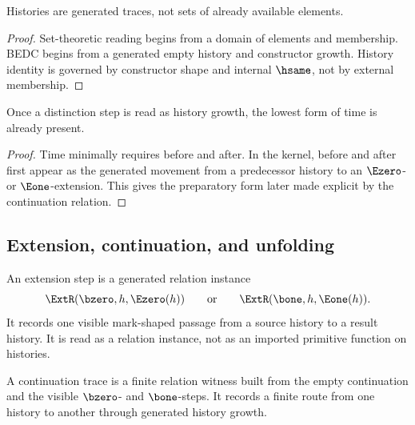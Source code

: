 \begin{corollary}
\label{cor:philosophy-histories-are-not-sets}
Histories are generated traces, not sets of already available elements.
\end{corollary}
\begin{proof}
Set-theoretic reading begins from a domain of elements and membership.
BEDC begins from a generated empty history and constructor growth.
History identity is governed by constructor shape and internal
\(\hsame\), not by external membership.
\end{proof}

\begin{corollary}
\label{cor:philosophy-lowest-form-time-history-growth}
Once a distinction step is read as history growth, the lowest form of
time is already present.
\end{corollary}
\begin{proof}
Time minimally requires before and after. In the kernel, before and
after first appear as the generated movement from a predecessor history
to an \(\Ezero\)- or \(\Eone\)-extension. This gives the preparatory
form later made explicit by the continuation relation.
\end{proof}

\subsection{Extension, continuation, and unfolding}
\label{subsec:extension-continuation-unfolding}

\begin{definition}
\label{def:philosophy-extension-step}
An extension step is a generated relation instance
$$
\ExtR(\bzero,h,\Ezero(h))
\qquad\text{or}\qquad
\ExtR(\bone,h,\Eone(h)).
$$
It records one visible mark-shaped passage from a source history to a
result history. It is read as a relation instance, not as an imported
primitive function on histories.
\end{definition}

\begin{definition}
\label{def:philosophy-continuation-trace}
A continuation trace is a finite relation witness built from the empty
continuation and the visible $\bzero$- and $\bone$-steps. It records a
finite route from one history to another through generated history
growth.
\end{definition}

